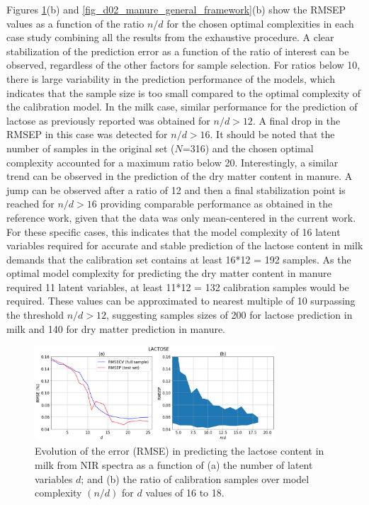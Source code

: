 \documentclass[journal=ancham,manuscript=article]{achemso}
\begin{document}
Figures \ref{fig_d01_milk_general_framework}(b) and \ref{fig_d02_manure_general_framework}(b) show the RMSEP values as a function of the ratio $n/d$ for the chosen optimal complexities in each case study combining all the results from the exhaustive procedure. A clear stabilization of the prediction error as a function of the ratio of interest can be observed, regardless of the other factors for sample selection. For ratios below 10, there is large variability in the prediction performance of the models, which indicates that the sample size is too small compared to the optimal complexity of the calibration model. In the milk case, similar performance for the prediction of lactose as previously reported \cite{Diaz-Olivares2020, Aernouts2011} was obtained for $n/d>12$. A final drop in the RMSEP in this case was detected for $n/d>16$. It should be noted that the number of samples in the original set ($N$=316) and the chosen optimal complexity accounted for a maximum ratio below 20. Interestingly, a similar trend can be observed in the prediction of the dry matter content in manure. A jump can be observed after a ratio of 12 and then a final stabilization point is reached for $n/d>16$ providing comparable performance as obtained in the reference work, given that the data was only mean-centered in the current work\cite{Saeys2005}. For these specific cases, this indicates that the model complexity of 16 latent variables required for accurate and stable prediction of the lactose content in milk demands that the calibration set contains at least 16*12 = 192 samples. As the optimal model complexity for predicting the dry matter content in manure required 11 latent variables, at least 11*12 = 132 calibration samples would be required. These values can be approximated to nearest multiple of 10 surpassing the threshold $n/d>12$, suggesting samples sizes of 200 for lactose prediction in milk and 140 for dry matter prediction in manure.

\begin{figure}[b]
\includegraphics[width=0.8\textwidth]{manuscript/figures/d01_milk_general_framework.png}
\centering
\caption{Evolution of the error (RMSE) in predicting the lactose content in milk from NIR spectra as a function of (a) the number of latent variables $d$; and (b) the ratio of calibration samples over model complexity $(n/d)$ for $d$ values of 16 to 18.}
\label{fig_d01_milk_general_framework}
\end{figure}
\end{document}
